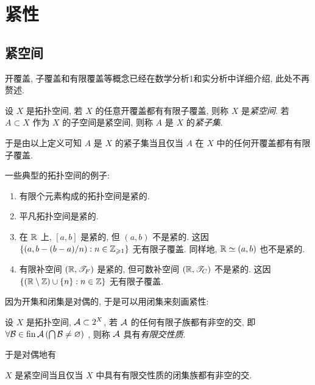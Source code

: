 
\section{紧性}

\subsection{紧空间}

    开覆盖, 子覆盖和有限覆盖等概念已经在数学分析1和实分析中详细介绍, 此处不再赘述.

    \begin{Definition}[紧空间]
        设 $ X $ 是拓扑空间, 若 $ X $ 的任意开覆盖都有有限子覆盖, 则称 $ X $ 是\emph{紧空间}. 若 $ A\subset X $ 作为 $ X $ 的子空间是紧空间, 则称 $ A $ 是 $ X $ 的\emph{紧子集}.
    \end{Definition}

    于是由以上定义可知 $ A $ 是 $ X $ 的紧子集当且仅当 $ A $ 在 $ X $ 中的任何开覆盖都有有限子覆盖.

    \begin{Example}
        一些典型的拓扑空间的例子:
        \begin{enumerate}
            \item 有限个元素构成的拓扑空间是紧的.
            \item 平凡拓扑空间是紧的.
            \item 在 $ \mathbb{R} $ 上, $ [a,b] $ 是紧的, 但 $ (a,b) $ 不是紧的. 这因 $ \left\{ (a,b-(b-a)/n) : n\in\mathbb{Z}_{\geqslant 1} \right\} $ 无有限子覆盖. 同样地, $ \mathbb{R}\simeq(a,b) $ 也不是紧的.
            \item 有限补空间 $ (\mathbb{R},\mathscr{T}_F) $ 是紧的, 但可数补空间 $ (\mathbb{R},\mathscr{T}_C) $ 不是紧的. 这因 $ \left\{ (\mathbb{R}\setminus\mathbb{Z})\cup\left\{ n \right\} : n\in\mathbb{Z} \right\} $ 无有限子覆盖.
        \end{enumerate}
    \end{Example}

    因为开集和闭集是对偶的, 于是可以用闭集来刻画紧性:

    \begin{Definition}[有限交性质]
        设 $ X $ 是拓扑空间, $ \mathcal{A}\subset 2^X $, 若 $ \mathcal{A} $ 的任何有限子族都有非空的交, 即 $ \forall\mathcal{B}\in\operatorname{fin}\mathcal{A}\,(\bigcap\mathcal{B}\ne\varnothing) $ , 则称 $ \mathcal{A} $ 具有\emph{有限交性质}.
    \end{Definition}
    于是对偶地有

    \begin{Proposition}
        $ X $ 是紧空间当且仅当 $ X $ 中具有有限交性质的闭集族都有非空的交.
    \end{Proposition}


